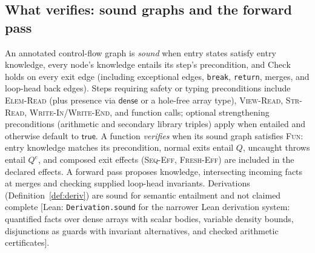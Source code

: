 \documentclass[10pt,a4paper]{article}
\theoremstyle{definition}
\theoremstyle{remark}
\newcommand{\kw}[1]{\mathsf{#1}}
\newcommand{\dense}{\kw{dense}}
\newcommand{\code}[1]{\texttt{#1}}
\newcommand{\lean}[1]{\texttt{\small #1}}
\newcommand{\status}[1]{\textsf{\small[#1]}}
\begin{document}
\subsection{What verifies: sound graphs and the forward pass}
An annotated control-flow graph is \emph{sound} when entry states satisfy
entry knowledge, every node's knowledge entails its step's precondition,
and $\mathrm{Check}$ holds on every exit edge (including exceptional
edges, \code{break}, \code{return}, merges, and loop-head back edges).
Steps requiring safety or typing preconditions include \textsc{Elem-Read}
(plus presence via $\dense$ or a hole-free array type),
\textsc{View-Read}, \textsc{Str-Read}, \textsc{Write-In}/\textsc{Write-End},
and function calls; optional strengthening preconditions (arithmetic and
secondary library triples) apply when entailed and otherwise default to
$\kw{true}$. A function \emph{verifies} when its sound graph satisfies
\textsc{Fun}: entry knowledge matches its precondition, normal exits
entail $Q$, uncaught throws entail $Q^{e}$, and composed exit effects
(\textsc{Seq-Eff}, \textsc{Fresh-Eff}) are included in the declared
effects. A forward pass proposes knowledge, intersecting incoming facts
at merges and checking supplied loop-head invariants. Derivations
(Definition~\ref{def:deriv}) are sound for semantic entailment and not
claimed complete
\status{Lean: \lean{Derivation.sound} for the narrower Lean derivation system: quantified facts over dense arrays with scalar bodies, variable density bounds, disjunctions as guards with invariant alternatives, and checked arithmetic certificates}.
\end{document}
